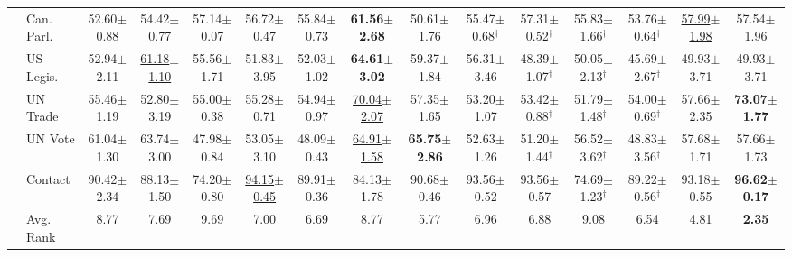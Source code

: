 \begin{table}[t]
{\begin{tabular}{llccccccccccccc}
 & Can. Parl. & 52.60{\scriptsize$\pm$0.88} & 54.42{\scriptsize$\pm$0.77} & 57.14{\scriptsize$\pm$0.07} & 56.72{\scriptsize$\pm$0.47} & 55.84{\scriptsize$\pm$0.73} & \textbf{61.56{\scriptsize$\pm$2.68}} & 50.61{\scriptsize$\pm$1.76} & 55.47{\scriptsize$\pm$0.68}$^\dagger$ & 57.31{\scriptsize$\pm$0.52}$^\dagger$ & 55.83{\scriptsize$\pm$1.66}$^\dagger$ & 53.76{\scriptsize$\pm$0.64}$^\dagger$ & \underline{57.99{\scriptsize$\pm$1.98}} & 57.54{\scriptsize$\pm$1.96} \\
 & US Legis. & 52.94{\scriptsize$\pm$2.11} & \underline{61.18{\scriptsize$\pm$1.10}} & 55.56{\scriptsize$\pm$1.71} & 51.83{\scriptsize$\pm$3.95} & 52.03{\scriptsize$\pm$1.02} & \textbf{64.61{\scriptsize$\pm$3.02}} & 59.37{\scriptsize$\pm$1.84} & 56.31{\scriptsize$\pm$3.46} & 48.39{\scriptsize$\pm$1.07}$^\dagger$ & 50.05{\scriptsize$\pm$2.13}$^\dagger$ & 45.69{\scriptsize$\pm$2.67}$^\dagger$ & 49.93{\scriptsize$\pm$3.71} & 49.93{\scriptsize$\pm$3.71} \\
 & UN Trade & 55.46{\scriptsize$\pm$1.19} & 52.80{\scriptsize$\pm$3.19} & 55.00{\scriptsize$\pm$0.38} & 55.28{\scriptsize$\pm$0.71} & 54.94{\scriptsize$\pm$0.97} & \underline{70.04{\scriptsize$\pm$2.07}} & 57.35{\scriptsize$\pm$1.65} & 53.20{\scriptsize$\pm$1.07} & 53.42{\scriptsize$\pm$0.88}$^\dagger$ & 51.79{\scriptsize$\pm$1.48}$^\dagger$ & 54.00{\scriptsize$\pm$0.69}$^\dagger$ & 57.66{\scriptsize$\pm$2.35} & \textbf{73.07{\scriptsize$\pm$1.77}} \\
 & UN Vote & 61.04{\scriptsize$\pm$1.30} & 63.74{\scriptsize$\pm$3.00} & 47.98{\scriptsize$\pm$0.84} & 53.05{\scriptsize$\pm$3.10} & 48.09{\scriptsize$\pm$0.43} & \underline{64.91{\scriptsize$\pm$1.58}} & \textbf{65.75{\scriptsize$\pm$2.86}} & 52.63{\scriptsize$\pm$1.26} & 51.20{\scriptsize$\pm$1.44}$^\dagger$ & 56.52{\scriptsize$\pm$3.62}$^\dagger$ & 48.83{\scriptsize$\pm$3.56}$^\dagger$ & 57.68{\scriptsize$\pm$1.71} & 57.66{\scriptsize$\pm$1.73} \\
 & Contact & 90.42{\scriptsize$\pm$2.34} & 88.13{\scriptsize$\pm$1.50} & 74.20{\scriptsize$\pm$0.80} & \underline{94.15{\scriptsize$\pm$0.45}} & 89.91{\scriptsize$\pm$0.36} & 84.13{\scriptsize$\pm$1.78} & 90.68{\scriptsize$\pm$0.46} & 93.56{\scriptsize$\pm$0.52} & 93.56{\scriptsize$\pm$0.57} & 74.69{\scriptsize$\pm$1.23}$^\dagger$ & 89.22{\scriptsize$\pm$0.56}$^\dagger$ & 93.18{\scriptsize$\pm$0.55} & \textbf{96.62{\scriptsize$\pm$0.17}} \\
\cmidrule{2-15}
 & Avg. Rank & 8.77 & 7.69 & 9.69 & 7.00 & 6.69 & 8.77 & 5.77 & 6.96 & 6.88 & 9.08 & 6.54 & \underline{4.81} & \textbf{2.35} \\

\end{tabular}}
\end{table}
